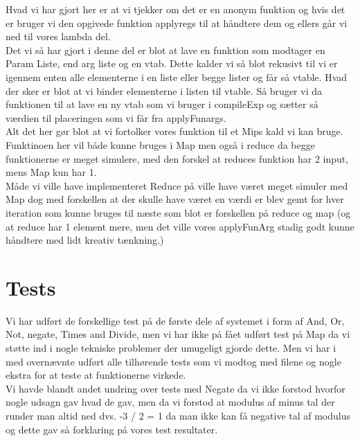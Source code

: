 \documentclass[a4paper]{article}
\begin{document}
Hvad vi har gjort her er at vi tjekker om det er en anonym funktion og hvis det er bruger vi den opgivede funktion applyregs til at håndtere dem og ellers går vi ned til vores lambda del.\\
Det vi så har gjort i denne del er blot at lave en funktion som modtager en Param Liste, end arg liste og en vtab. Dette kalder vi så blot rekusivt til vi er igennem enten alle elementerne i en liste eller begge lister og får så vtable. Hvad der sker er blot at vi binder elementerne i listen til vtable. Så bruger vi da funktionen til at lave en ny vtab som vi bruger i compileExp og sætter så værdien til placeringen som vi får fra applyFunargs.\\
Alt det her gør blot at vi fortolker vores funktion til et Mips kald vi kan bruge.\\
Funktinoen her vil både kunne bruges i Map men også i reduce da begge funktionerne er meget simulere, med den forskel at reduces funktion har 2 input, mens Map kun har 1.\\[0.1in]
Måde vi ville have implementeret Reduce på ville have været meget simuler med Map dog med forskellen at der skulle have været en værdi er blev gemt for hver iteration som kunne bruges til næste som blot er forskellen på reduce og map (og at reduce har 1 element mere, men det ville vores applyFunArg stadig godt kunne håndtere med lidt kreativ tænkning.)
\section{Tests}
Vi har udført de forskellige test på de første dele af systemet i form af And, Or, Not, negate, Times and Divide, men vi har ikke på fået udført test på Map da vi støtte ind i nogle tekniske problemer der umugeligt gjorde dette. Men vi har i med overnævnte udført alle tilhørende tests som vi modtog med filene og nogle ekstra for at teste at funktionerne virkede.\\
Vi havde blandt andet undring over tests med Negate da vi ikke forstod hvorfor nogle udsagn gav hvad de gav, men da vi forstod at modulus af minus tal der runder man altid ned dvs. -3 / 2 = 1 da man ikke kan få negative tal af modulus og dette gav så forklaring på vores test resultater.
\end{document}

